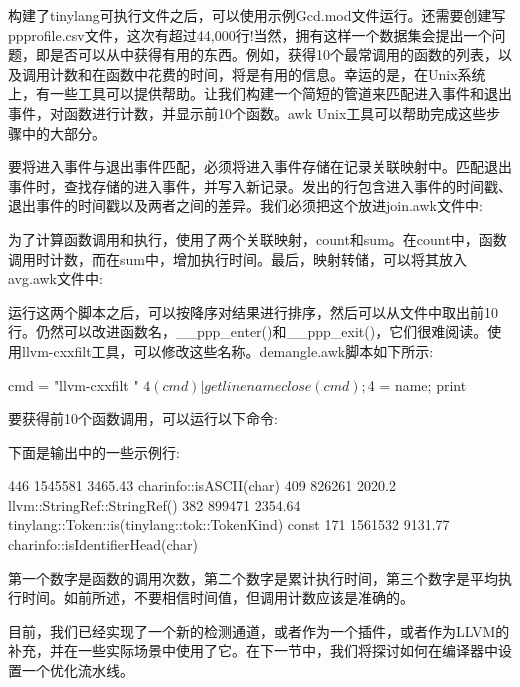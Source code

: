 构建了tinylang可执行文件之后，可以使用示例Gcd.mod文件运行。还需要创建写ppprofile.csv文件，这次有超过44,000行!当然，拥有这样一个数据集会提出一个问题，即是否可以从中获得有用的东西。例如，获得10个最常调用的函数的列表，以及调用计数和在函数中花费的时间，将是有用的信息。幸运的是，在Unix系统上，有一些工具可以提供帮助。让我们构建一个简短的管道来匹配进入事件和退出事件，对函数进行计数，并显示前10个函数。awk Unix工具可以帮助完成这些步骤中的大部分。

要将进入事件与退出事件匹配，必须将进入事件存储在记录关联映射中。匹配退出事件时，查找存储的进入事件，并写入新记录。发出的行包含进入事件的时间戳、退出事件的时间戳以及两者之间的差异。我们必须把这个放进join.awk文件中:


为了计算函数调用和执行，使用了两个关联映射，count和sum。在count中，函数调用时计数，而在sum中，增加执行时间。最后，映射转储，可以将其放入avg.awk文件中:


运行这两个脚本之后，可以按降序对结果进行排序，然后可以从文件中取出前10行。仍然可以改进函数名，\_\_ppp\_enter()和\_\_ppp\_exit()，它们很难阅读。使用llvm-cxxfilt工具，可以修改这些名称。demangle.awk脚本如下所示:

\begin{shell}
{ cmd = "llvm-cxxfilt " $4
    (cmd) | getline name
    close(cmd); $4 = name; print }
\end{shell}

要获得前10个函数调用，可以运行以下命令:


下面是输出中的一些示例行:

\begin{shell}
446 1545581 3465.43 charinfo::isASCII(char)
409 826261 2020.2 llvm::StringRef::StringRef()
382 899471 2354.64
            tinylang::Token::is(tinylang::tok::TokenKind) const
171 1561532 9131.77 charinfo::isIdentifierHead(char)
\end{shell}

第一个数字是函数的调用次数，第二个数字是累计执行时间，第三个数字是平均执行时间。如前所述，不要相信时间值，但调用计数应该是准确的。

目前，我们已经实现了一个新的检测通道，或者作为一个插件，或者作为LLVM的补充，并在一些实际场景中使用了它。在下一节中，我们将探讨如何在编译器中设置一个优化流水线。


